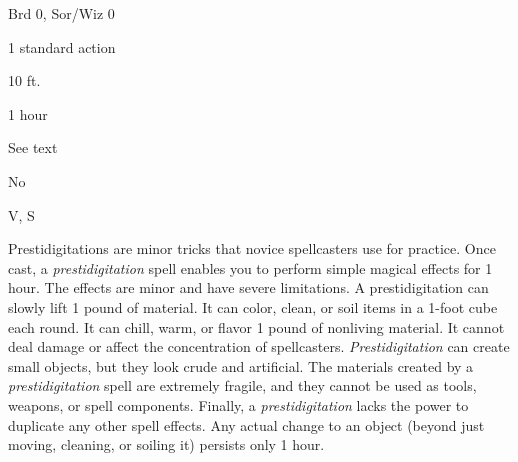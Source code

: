 
\begin{description*}
\item[Level:] Brd 0, Sor/Wiz 0
\item[Casting Time:] 1 standard action
\item[Range:] 10 ft.
\item[Duration:] 1 hour
\item[Saving Throw:] See text
\item[Spell Resistance:] No
\item[Components:] V, S
\end{description*}

Prestidigitations are minor tricks that novice spellcasters use for practice. Once
cast, a \textit{prestidigitation} spell enables you to perform simple magical effects
for 1 hour. The effects are minor and have severe limitations. A prestidigitation
can slowly lift 1 pound of material. It can color, clean, or soil items in a 1-foot
cube each round. It can chill, warm, or flavor 1 pound of nonliving material. It
cannot deal damage or affect the concentration of spellcasters. \textit{Prestidigitation
}can create small objects, but they look crude and artificial. The materials created
by a \textit{prestidigitation} spell are extremely fragile, and they cannot be
used as tools, weapons, or spell components. Finally, a \textit{prestidigitation
}lacks the power to duplicate any other spell effects. Any actual change to an
object (beyond just moving, cleaning, or soiling it) persists only 1 hour.